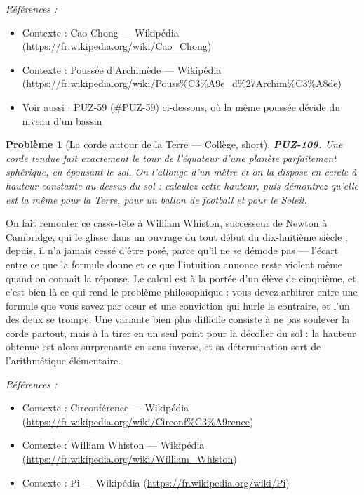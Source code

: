 \documentclass[11pt]{article}
\newtheorem{problem}{Problème}
\newenvironment{refs}{\par\small\noindent\emph{Références :}\begin{itemize}\setlength\itemsep{0pt}}{\end{itemize}\normalsize}
\begin{document}
\begin{refs}
\item Contexte : Cao Chong --- Wikipédia (\url{https://fr.wikipedia.org/wiki/Cao_Chong})
\item Contexte : Poussée d'Archimède --- Wikipédia (\url{https://fr.wikipedia.org/wiki/Pouss%C3%A9e_d%27Archim%C3%A8de})
\item Voir aussi : PUZ-59 (\url{#PUZ-59}) ci-dessous, où la même poussée décide du niveau d'un bassin
\end{refs}

\bigskip

\begin{problem}[{La corde autour de la Terre --- Collège, short}]
\textbf{PUZ-109.} Une corde tendue fait exactement le tour de l'équateur
d'une planète parfaitement sphérique, en épousant le sol. On l'allonge d'un mètre et on la
dispose en cercle à hauteur constante au-dessus du sol : calculez cette hauteur, puis
démontrez qu'elle est la même pour la Terre, pour un ballon de football et pour le Soleil.
\end{problem}

\noindent On fait remonter ce casse-tête à William Whiston, successeur de Newton à
Cambridge, qui le glisse dans un ouvrage du tout début du dix-huitième siècle ; depuis, il
n'a jamais cessé d'être posé, parce qu'il ne se démode pas --- l'écart entre ce que la formule
donne et ce que l'intuition annonce reste violent même quand on connaît la réponse. Le calcul
est à la portée d'un élève de cinquième, et c'est bien là ce qui rend le problème
philosophique : vous devez arbitrer entre une formule que vous savez par c\oe{}ur et une
conviction qui hurle le contraire, et l'un des deux se trompe. Une variante bien plus
difficile consiste à ne pas soulever la corde partout, mais à la tirer en un seul point pour
la décoller du sol : la hauteur obtenue est alors surprenante en sens inverse, et sa
détermination sort de l'arithmétique élémentaire.

\begin{refs}
\item Contexte : Circonférence --- Wikipédia (\url{https://fr.wikipedia.org/wiki/Circonf%C3%A9rence})
\item Contexte : William Whiston --- Wikipédia (\url{https://fr.wikipedia.org/wiki/William_Whiston})
\item Contexte : Pi --- Wikipédia (\url{https://fr.wikipedia.org/wiki/Pi})
\end{refs}
\end{document}
